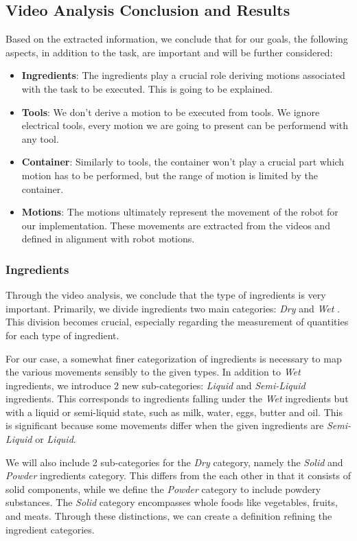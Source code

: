 \subsection*{Video Analysis Conclusion and Results}

Based on the extracted information, we conclude that for our goals, the following aspects, in addition to the task, are important and will be further considered:
\begin{itemize}
  \item \textbf{Ingredients}: The ingredients play a crucial role deriving motions associated with the task to be executed. 
  This is going to be explained.
  \item \textbf{Tools}: We don't derive a motion to be executed from tools. We ignore electrical tools, every motion
  we are going to present can be performend with any tool.
  \item \textbf{Container}: Similarly to tools, the container won't play a crucial part which motion has to be performed, but 
  the range of motion is limited by the container.
  \item \textbf{Motions}: The motions ultimately represent the movement of the robot for our implementation. These movements are extracted from the videos and defined in alignment with robot motions.
\end{itemize}

\subsubsection{Ingredients}
Through the video analysis, we conclude that the type of ingredients is very important. 
Primarily, we divide ingredients two main categories: \textit{Dry} and \textit{Wet} \cite{Ohene2017}. 
This division becomes crucial, especially regarding the measurement of quantities for each type of ingredient.

For our case, a somewhat finer categorization of ingredients is necessary to map the various movements sensibly to the given types. 
In addition to \textit{Wet} ingredients, we introduce 2 new sub-categories: \textit{Liquid} and \textit{Semi-Liquid} ingredients. 
This corresponds to ingredients falling under the \textit{Wet} ingredients but with a liquid or semi-liquid state, such as milk, water, eggs, butter and oil. 
This is significant because some movements differ when the given ingredients are \textit{Semi-Liquid} or \textit{Liquid}.

We will also include 2 sub-categories for the \textit{Dry} category, namely the \textit{Solid} and \textit{Powder} ingredients category. 
This differs from the each other in that it consists of solid components, while we define the \textit{Powder} category to include powdery substances. 
The \textit{Solid} category encompasses whole foods like vegetables, fruits, and meats. 
Through these distinctions, we can create a definition refining the ingredient categories.

